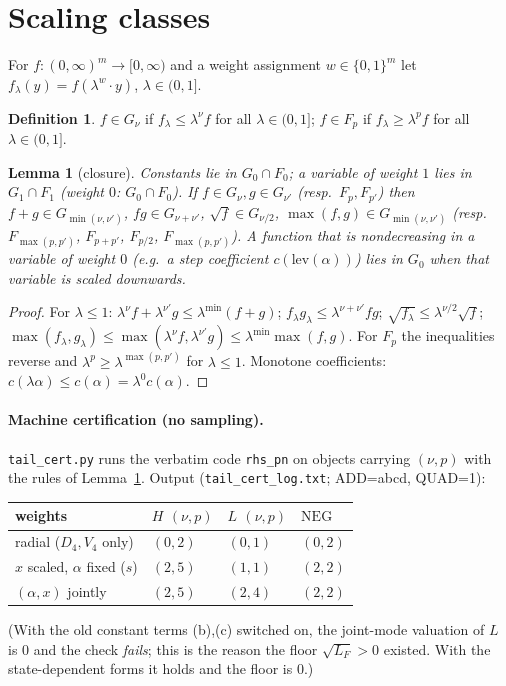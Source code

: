 \documentclass[11pt]{article}
\newtheorem{lemma}{Lemma}
\theoremstyle{definition}
\newtheorem{definition}{Definition}
\begin{document}
\section{Scaling classes}
For $f:(0,\infty)^m\to[0,\infty)$ and a weight assignment $w\in\{0,1\}^m$ let $f_\lambda(y)=f(\lambda^{w}\!\cdot y)$, $\lambda\in(0,1]$.
\begin{definition} $f\in G_\nu$ if $f_\lambda\le\lambda^{\nu}f$ for all $\lambda\in(0,1]$; $f\in F_p$ if $f_\lambda\ge\lambda^{p}f$ for all $\lambda\in(0,1]$.
\end{definition}
\begin{lemma}[closure]\label{lem:closure}
Constants lie in $G_0\cap F_0$; a variable of weight $1$ lies in $G_1\cap F_1$ (weight $0$: $G_0\cap F_0$). If $f\in G_{\nu},g\in G_{\nu'}$ (resp.\ $F_p,F_{p'}$) then
$f+g\in G_{\min(\nu,\nu')}$, $fg\in G_{\nu+\nu'}$, $\sqrt f\in G_{\nu/2}$, $\max(f,g)\in G_{\min(\nu,\nu')}$ (resp.\ $F_{\max(p,p')}$, $F_{p+p'}$, $F_{p/2}$, $F_{\max(p,p')}$).
A function that is nondecreasing in a variable of weight $0$ (e.g.\ a step coefficient $c(\mathrm{lev}(\alpha))$) lies in $G_0$ when that variable is scaled \emph{downwards}.
\end{lemma}
\begin{proof} For $\lambda\le1$: $\lambda^{\nu}f+\lambda^{\nu'}g\le\lambda^{\min}(f+g)$; $f_\lambda g_\lambda\le\lambda^{\nu+\nu'}fg$; $\sqrt{f_\lambda}\le\lambda^{\nu/2}\sqrt f$;
$\max(f_\lambda,g_\lambda)\le\max(\lambda^\nu f,\lambda^{\nu'}g)\le\lambda^{\min}\max(f,g)$. For $F_p$ the inequalities reverse and $\lambda^{p}\ge\lambda^{\max(p,p')}$ for $\lambda\le1$. Monotone coefficients: $c(\lambda\alpha)\le c(\alpha)=\lambda^0c(\alpha)$.
\end{proof}
\paragraph{Machine certification (no sampling).} \texttt{tail\_cert.py} runs the verbatim code \texttt{rhs\_pn} on objects carrying $(\nu,p)$ with the rules of Lemma~\ref{lem:closure}. Output (\texttt{tail\_cert\_log.txt}; ADD=abcd, QUAD=1):
\begin{center}\begin{tabular}{llll}\toprule
weights & $H$ $(\nu,p)$ & $L$ $(\nu,p)$ & $\mathrm{NEG}$ \\ \midrule
radial ($D_4,V_4$ only) & $(0,2)$ & $(0,1)$ & $(0,2)$\\
$x$ scaled, $\alpha$ fixed ($s$) & $(2,5)$ & $(1,1)$ & $(2,2)$\\
$(\alpha,x)$ jointly & $(2,5)$ & $(2,4)$ & $(2,2)$\\ \bottomrule\end{tabular}\end{center}
(With the old constant terms (b),(c) switched on, the joint-mode valuation of $L$ is $0$ and the check \emph{fails}; this is the reason the floor $\sqrt{L_F}>0$ existed. With the state-dependent forms it holds and the floor is $0$.)
\end{document}
